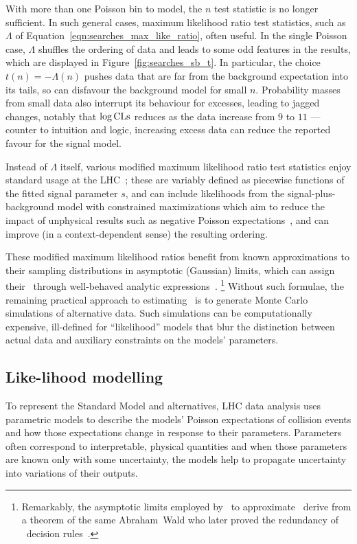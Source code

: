 With more than one Poisson bin to model, the $n$ test statistic is no longer
sufficient.
In such general cases, maximum likelihood ratio test statistics,
such as $\Lambda$ of Equation~\ref{eqn:searches_max_like_ratio}, often useful.
In the single Poisson case, $\Lambda$ shuffles the ordering of
data and leads to some odd features in the results, which are displayed in
Figure~\ref{fig:searches_sb_t}.
In particular, the choice $t(n) = -\Lambda(n)$ pushes data that are far from
the background expectation into its tails, so can disfavour the background
model for small $n$.
Probability masses from small data also interrupt its behaviour for excesses,
leading to jagged changes, notably that $\log\mathrm{CLs}$ reduces as the data
increase from $9$ to $11$ --- counter to intuition and logic, increasing excess
data can reduce the reported favour for the signal model.

Instead of $\Lambda$ itself, various modified maximum likelihood ratio test
statistics enjoy standard usage at the LHC~\cite{cern2011procedure};
these are variably defined as piecewise functions of the fitted signal
parameter $s$, and can include likelihoods from the signal-plus-background
model with constrained maximizations which aim to reduce the impact of
unphysical results such as negative Poisson expectations~\cite{
Feldman:1997qc,
Cowan:2010js
},
and can improve (in a context-dependent sense) the resulting ordering.

These modified maximum likelihood ratios benefit from known approximations to
their sampling distributions in asymptotic (Gaussian) limits,
which can assign their \pvalues\ through well-behaved analytic
expressions~\cite{
Cowan:2010js,
wilks1938large,
wald1943tests
}.%
\footnote{%
Remarkably, the asymptotic limits employed by~\cite{Cowan:2010js} to
approximate \pvalues\ derive from a theorem of the same Abraham~Wald who later
proved the redundancy of \pvalue\ decision rules~\cite{wald1947bayes}.%
}
Without such formulae, the remaining practical approach to estimating
\pvalues\ is to generate Monte Carlo simulations of alternative data.
Such simulations can be computationally expensive, ill-defined for
``likelihood'' models that blur the distinction between actual data and
auxiliary constraints on the models' parameters.


\subsection{Like-lihood modelling}
To represent the Standard Model and alternatives, LHC data analysis uses
parametric models to describe the models' Poisson expectations of
collision events and how those expectations change in response to their
parameters.
Parameters often correspond to interpretable, physical quantities and when
those parameters are known only with some uncertainty, the models help to
propagate uncertainty into variations of their outputs.

